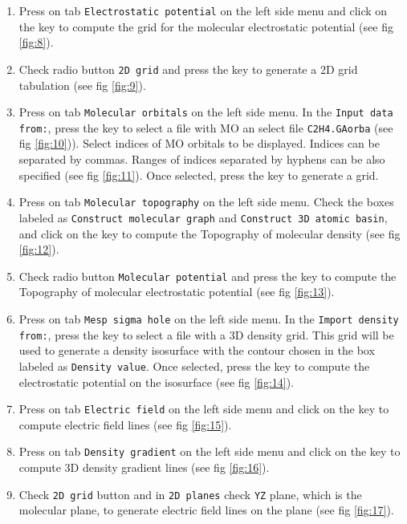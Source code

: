 \documentclass[a4paper,10pt]{article}
\begin{document}
\begin{enumerate}
\item Press on tab \texttt{Electrostatic potential} on the left side menu and
click on the \exec key to compute the grid for the molecular electrostatic
potential (see fig \ref{fig:8}).

\item Check radio button \texttt{2D grid} and press the \exec key to generate
a 2D grid tabulation (see fig \ref{fig:9}).

\item Press on tab \texttt{Molecular orbitals} on the left side menu. 
In the \texttt{Input data from:}, press the \teclapuntos key to select a file with MO 
an select file \texttt{C2H4.GAorba} (see fig \ref{fig:10})).
Select indices of MO orbitals to be displayed. Indices can be separated by commas.
Ranges of indices separated by hyphens can be also specified (see fig \ref{fig:11}).
Once selected, press the \exec key to generate a grid.

\item Press on tab \texttt{Molecular topography} on the left side menu. Check
the boxes labeled as \texttt{Construct molecular graph} and
\texttt{Construct 3D atomic basin}, and
click on the \exec key to compute the Topography of molecular density (see fig
\ref{fig:12}).

\item Check radio button \texttt{Molecular potential} and press the \exec key 
to compute the Topography of molecular electrostatic potential (see fig \ref{fig:13}).

\item Press on tab \texttt{Mesp sigma hole} on the left side menu.
In the \texttt{Import density from:}, press the \teclapuntos key to select a file with 
a 3D density grid. This grid will be used to generate a density isosurface
with the contour chosen in the box labeled as \texttt{Density value}.
Once selected, press the \exec key to compute the electrostatic potential
on the isosurface (see fig \ref{fig:14}).

\item Press on tab \texttt{Electric field} on the left side menu and
click on the \exec key to compute electric field lines
(see fig \ref{fig:15}).

\item Press on tab \texttt{Density gradient} on the left side menu and
click on the \exec key to compute 3D density gradient lines
(see fig \ref{fig:16}). 

\item Check \texttt{2D grid} button and
in \texttt{2D planes} check \texttt{YZ} plane, which is the molecular plane,
to generate electric field lines on the plane (see fig \ref{fig:17}).


\end{enumerate}
\end{document}

